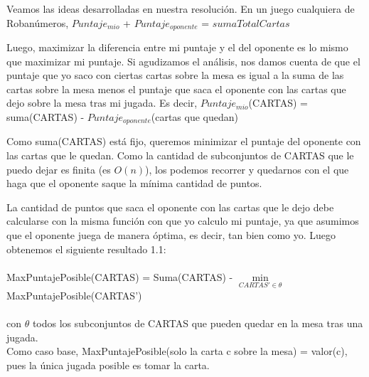 \documentclass[11pt, a4paper, twoside]{article}
\begin{document}
{}

Veamos las ideas desarrolladas en nuestra resolución. En un juego cualquiera de Robanúmeros, $Puntaje_{mio}$ + $Puntaje_{oponente}$ = $sumaTotalCartas$

Luego, maximizar la diferencia entre mi puntaje y el del oponente es lo mismo que maximizar mi puntaje. Si agudizamos el análisis, nos damos cuenta de que el puntaje que yo saco con ciertas cartas sobre la mesa es igual a la suma de las cartas sobre la mesa menos el puntaje que saca el oponente con las cartas que dejo sobre la mesa tras mi jugada. Es decir,
$Puntaje_{mio}$(CARTAS) = suma(CARTAS) - $Puntaje_{oponente}$(cartas que quedan)

Como suma(CARTAS) está fijo, queremos minimizar el puntaje del oponente con las cartas que le quedan. Como la cantidad de subconjuntos de CARTAS que le puedo dejar es finita (es $O(n)$), los podemos recorrer y quedarnos con el que haga que el oponente saque la mínima cantidad de puntos. 

La cantidad de puntos que saca el oponente con las cartas que le dejo debe calcularse con la misma función con que yo calculo mi puntaje, ya que asumimos que el oponente juega de manera óptima, es decir, tan bien como yo. Luego obtenemos el siguiente resultado 1.1:
\\\\MaxPuntajePosible(CARTAS) = Suma(CARTAS) - $\min\limits_{CARTAS' \in \theta}$ 
MaxPuntajePosible(CARTAS')
\\\\con $\theta$ todos los subconjuntos de CARTAS que pueden quedar en la mesa tras una jugada.
\\Como caso base, MaxPuntajePosible(solo la carta c sobre la mesa) = valor(c), pues la única jugada posible es tomar la carta.

\end{document}

